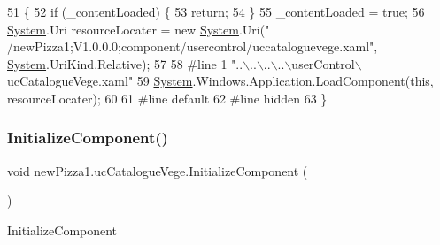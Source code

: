 \begin{DoxyCode}
51                                           \{
52             \textcolor{keywordflow}{if} (\_contentLoaded) \{
53                 \textcolor{keywordflow}{return};
54             \}
55             \_contentLoaded = \textcolor{keyword}{true};
56             \hyperlink{namespaceSystem}{System}.Uri resourceLocater = \textcolor{keyword}{new} \hyperlink{namespaceSystem}{System}.Uri(\textcolor{stringliteral}{"
      /newPizza1;V1.0.0.0;component/usercontrol/uccataloguevege.xaml"}, \hyperlink{namespaceSystem}{System}.UriKind.Relative);
57             
58 \textcolor{preprocessor}{            #line 1 "..\(\backslash\)..\(\backslash\)..\(\backslash\)..\(\backslash\)userControl\(\backslash\)ucCatalogueVege.xaml"}
59             \hyperlink{namespaceSystem}{System}.Windows.Application.LoadComponent(\textcolor{keyword}{this}, resourceLocater);
60             
61 \textcolor{preprocessor}{            #line default}
62 \textcolor{preprocessor}{            #line hidden}
63         \}
\end{DoxyCode}
\mbox{\label{classnewPizza1_1_1ucCatalogueVege_afc2e8f9dfd99c8252e745a8636e230da}} 
\subsubsection{\texorpdfstring{Initialize\+Component()}{InitializeComponent()}\hspace{0.1cm}{\footnotesize\ttfamily [5/6]}}
{\footnotesize\ttfamily void new\+Pizza1.\+uc\+Catalogue\+Vege.\+Initialize\+Component (\begin{DoxyParamCaption}{ }\end{DoxyParamCaption})\hspace{0.3cm}{\ttfamily [inline]}}



Initialize\+Component 


